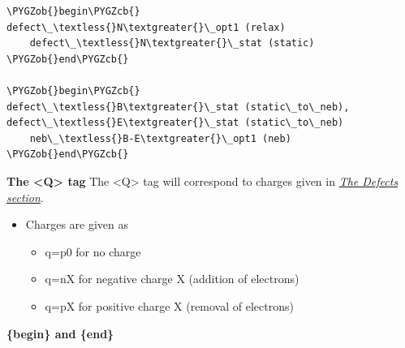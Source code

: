\documentclass[letterpaper,10pt,english]{sphinxmanual}
\def\PYGZob{\char`\{}
\def\PYGZcb{\char`\}}
\begin{document}
\begin{Verbatim}[commandchars=\\\{\}]
\PYGZob{}begin\PYGZcb{}
defect\_\textless{}N\textgreater{}\_opt1 (relax)
    defect\_\textless{}N\textgreater{}\_stat (static)
\PYGZob{}end\PYGZcb{}

\PYGZob{}begin\PYGZcb{}
defect\_\textless{}B\textgreater{}\_stat (static\_to\_neb), defect\_\textless{}E\textgreater{}\_stat (static\_to\_neb)
    neb\_\textless{}B-E\textgreater{}\_opt1 (neb)
\PYGZob{}end\PYGZcb{}
\end{Verbatim}

\textbf{The \textless{}Q\textgreater{} tag}
The \textless{}Q\textgreater{} tag will correspond to charges given in {\hyperref[3_1_5_defects::doc]{\emph{The Defects section}}}.
\begin{itemize}
\item {} 
Charges are given as
\begin{itemize}
\item {} 
q=p0 for no charge

\item {} 
q=nX for negative charge X (addition of electrons)

\item {} 
q=pX for positive charge X (removal of electrons)

\end{itemize}

\end{itemize}

\textbf{\{begin\} and \{end\}}
\end{document}
